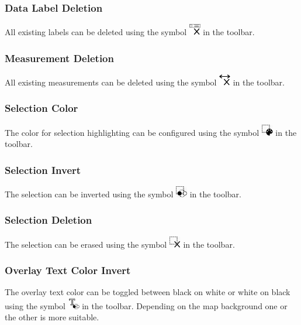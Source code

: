 \subsubsection{Data Label Deletion}

All existing labels can be deleted using the symbol \includegraphics[width=0.5cm,frame]{../../data/icons/label_delete.png} in the toolbar.

\subsubsection{Measurement Deletion}

All existing measurements can be deleted using the symbol \includegraphics[width=0.5cm,frame]{../../data/icons/measurement_delete.png} in the toolbar.

\subsubsection{Selection Color}

The color for selection highlighting can be configured using the symbol \includegraphics[width=0.5cm,frame]{../../data/icons/select_color.png} in the toolbar.

\subsubsection{Selection Invert}

The selection can be inverted using the symbol \includegraphics[width=0.5cm,frame]{../../data/icons/select_invert.png} in the toolbar.

\subsubsection{Selection Deletion}

The selection can be erased using the symbol \includegraphics[width=0.5cm,frame]{../../data/icons/select_delete.png} in the toolbar.

\subsubsection{Overlay Text Color Invert}

The overlay text color can be toggled between black on white or white on black using the symbol \includegraphics[width=0.5cm,frame]{../../data/icons/text_invert.png} in the toolbar. Depending on the map background one or the other is more suitable.
